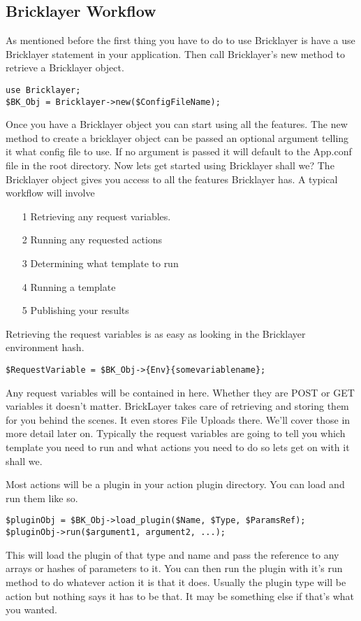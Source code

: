\documentclass[letterpaper,10pt,oneside]{book}
\begin{document}
\subsection*{Bricklayer Workflow}
As mentioned before the first thing you have to do to use Bricklayer is have a use Bricklayer statement in your application. Then call Bricklayer's new method to retrieve a Bricklayer object.
\begin{verbatim}
use Bricklayer;
$BK_Obj = Bricklayer->new($ConfigFileName);
\end{verbatim}
Once you have a Bricklayer object you can start using all the features. The new method to create a bricklayer object can be passed an optional argument telling it what config file to use. If no argument is passed it will default to the App.conf file in the root directory. Now lets get started using Bricklayer shall we? The Bricklayer object gives you access to all the features Bricklayer has. A typical workflow will involve
\begin{itemize}
\item[1] Retrieving any request variables.
\item[2] Running any requested actions
\item[3] Determining what template to run 
\item[4] Running a template
\item[5] Publishing your results
\end{itemize}
\par
Retrieving the request variables is as easy as looking in the Bricklayer environment hash.
\begin{verbatim}
$RequestVariable = $BK_Obj->{Env}{somevariablename};
\end{verbatim}
Any request variables will be contained in here. Whether they are POST or GET variables it doesn't matter. BrickLayer takes care of retrieving and storing them for you behind the scenes. It even stores File Uploads there. We'll cover those in more detail later on. Typically the request variables are going to tell you which template you need to run and what actions you need to do so lets get on with it shall we.
\par
Most actions will be a plugin in your action plugin directory. You can load and run them like so.
\begin{verbatim}
$pluginObj = $BK_Obj->load_plugin($Name, $Type, $ParamsRef);
$pluginObj->run($argument1, argument2, ...);
\end{verbatim}
This will load the plugin of that type and name and pass the reference to any arrays or hashes of parameters to it. You can then run the plugin with it's run method to do whatever action it is that it does. Usually the plugin type will be action but nothing says it has to be that. It may be something else if that's what you wanted.
\end{document}
